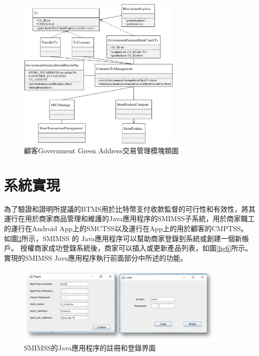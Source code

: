 	\begin{figure}[!htbp]
		\centering
		\includegraphics[width = 0.7\textwidth]{c6.jpg}
		\caption{顧客Government Green Address交易管理模塊類圖}\label{c6}
	\end{figure}

\section{系統實現}


為了驗證和證明所提議的BTMS用於比特幣支付收款監督的可行性和有效性，將其運行在用於商家商品管理和維護的Java應用程序的SMIMSS子系統，用於商家職工的運行在Android App上的SMCTSS以及運行在App上的用於顧客的CMPTSS。
如圖\ref{fig5}所示，SMIMSS 的 Java應用程序可以幫助商家登錄到系統或創建一個新帳戶。 授權商家成功登錄系統後，商家可以插入或更新產品列表，如圖\ref{fig6}所示。實現的SMIMSS Java應用程序執行前面部分中所述的功能。

\begin{figure}[!htbp]
	\centering
	\includegraphics[width = 0.9\textwidth]{fig5.png}
	\caption{SMIMSS的Java應用程序的註冊和登錄界面}\label{fig5}
\end{figure}

